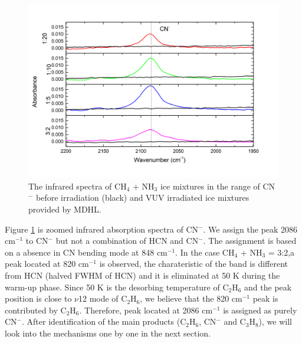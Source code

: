 \begin{figure}
\centering
\includegraphics[width=\textwidth]{figures/chapter3/CN.png}
\caption{The infrared spectra of CH$_4$ + NH$_3$ ice mixtures in the range of CN$^-$ before irradiation (black) and VUV irradiated ice mixtures provided by MDHL. }
\label{fig:CN}
\end{figure}

Figure \ref{fig:CN} is zoomed infrared absorption spectra of CN$^-$. We assign the peak 2086 cm$^{-1}$ to CN$^-$  but not a combination of HCN and CN$^-$. The assignment is based on a absence in CN bending mode at 848 cm$^{-1}$. In the case CH$_4$ + NH$_3$ = 3:2,a peak located at 820 cm$^{-1}$ is observed, the charateristic of the band is different from HCN (halved FWHM of HCN) and it is eliminated at 50 K during the warm-up phase. Since 50 K is the desorbing temperature of C$_2$H$_6$ and the peak position is close to $\nu$12 mode of C$_2$H$_6$, we believe that the 820 cm$^{-1}$ peak is contributed by C$_2$H$_6$. Therefore, peak located at 2086 cm$^{-1}$ is assigned as purely CN$^-$. After identification of the main products (C$_2$H$_6$, CN$^-$ and C$_3$H$_8$), we will look into the mechanisms one by one in the next section.\\

